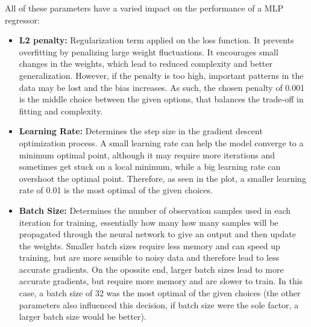 \documentclass[12pt]{article}
\begin{document}
\begin{enumerate}[leftmargin=\labelsep, label=\textbf{\arabic*.)},start=5]
          All of these parameters have a varied impact on the performance of a MLP regressor:
          \begin{itemize}
              \item \textbf{L2 penalty:} Regularization term applied on the loss function. It prevents overfitting by penalizing large weight fluctuations. It encourages small changes in the weights, which lead to reduced complexity and better generalization. However, if the penalty is too high, important patterns in the data may be lost and the bias increases. As such, the chosen penalty of 0.001 is the middle choice between the given options, that balances the trade-off in fitting and complexity.
              \item \textbf{Learning Rate:} Determines the step size in the gradient descent optimization process. A small learning rate can help the model converge to a minimum optimal point, although it may require more iterations and sometimes get stuck on a local minimum, while a big learning rate can overshoot the optimal point. Therefore, as seen in the plot, a smaller learning rate of 0.01 is the most optimal of the given choices.
              \item \textbf{Batch Size:} Determines the number of observation samples used in each iteration for training, essentially how many how many samples will be propagated through the neural network to give an output and then update the weights. Smaller batch sizes require less memory and can speed up training, but are more sensible to noisy data and therefore lead to less accurate gradients. On the opossite end, larger batch sizes lead to more accurate gradients, but require more memory and are slower to train. In this case, a batch size of 32 was the most optimal of the given choices (the other parameters also influenced this decision, if batch size were the sole factor, a larger batch size would be better).
          \end{itemize}
\end{enumerate}
\end{document}
